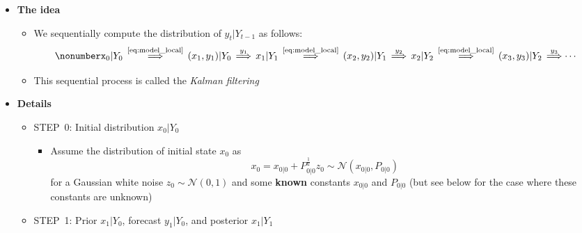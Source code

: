 \documentclass[12pt,a4paper]{article}
\begin{document}
\begin{itemize}

\item \textbf{The idea}
  \begin{itemize}
  \item We sequentially compute the distribution of $y_{t}|Y_{t-1}$ as follows:
    \begin{equation}\nonumber%
      x_{0}|Y_{0}
      \,
      \overset{\text{\eqref{eq:model_local}}}{\Longrightarrow}
      \,
      (x_{1},y_{1})|Y_{0}
      \,
      \overset{\text{$y_{1}$}}{\Longrightarrow}
      \,
      x_{1}|Y_{1}
      \,
      \overset{\text{\eqref{eq:model_local}}}{\Longrightarrow}
      \,
      (x_{2}, y_{2})|Y_{1}
      \,
      \overset{\text{$y_{2}$}}{\Longrightarrow}
      \,
      x_{2}|Y_{2}
      \,
      \overset{\text{\eqref{eq:model_local}}}{\Longrightarrow}
      \,
      (x_{3}, y_{3})|Y_{2}
      \,
      \overset{\text{$y_{3}$}}{\Longrightarrow}
      \cdots
    \end{equation}

  \item This sequential process is called the \emph{Kalman filtering}

  \end{itemize}

\item \textbf{Details}

  \begin{itemize}

  \item STEP~0: Initial distribution $x_{0}|Y_{0}$

    \begin{itemize}

    \item Assume the distribution of initial state $x_{0}$ as
      \begin{equation}\label{eq:alpha0}%
        x_{0} = x_{0|0} + P_{0|0}^{\frac{1}{2}}z_{0} \sim \mathcal{N}(x_{0|0},P_{0|0})
      \end{equation}
      for a Gaussian white noise $z_{0}\sim \mathcal{N}(0,1)$
      and some \textbf{known} constants $x_{0|0}$ and $P_{0|0}$ (but see below
      for the case where these constants are unknown)

    \end{itemize}

  \item STEP~1: Prior $x_{1}|Y_{0}$, forecast $y_{1}|Y_{0}$, and posterior $x_{1}|Y_{1}$


\end{itemize}
\end{itemize}
\end{document}

